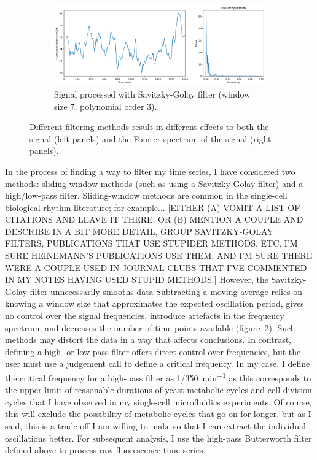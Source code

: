 \begin{figure}
  \begin{subfigure}[htpb]{0.8\textwidth}
   \centering
   \includegraphics[width=\textwidth]{fft_savgol}
   \caption{
     Signal processed with Savitzky-Golay filter (window size 7, polynomial order 3).
   }
   \label{fig:analysis-filter-savgol}
  \end{subfigure}
  \caption{
    Different filtering methods result in different effects to both the signal (left panels) and the Fourier spectrum of the signal (right panels).
  }
  \label{fig:analysis-filter}
\end{figure}

In the process of finding a way to filter my time series, I have considered two methods: sliding-window methods (such as using a Savitzky-Golay filter) and a high/low-pass filter.
Sliding-window methods are common in the single-cell biological rhythm literature; for example... [EITHER (A) VOMIT A LIST OF CITATIONS AND LEAVE IT THERE, OR (B) MENTION A COUPLE AND DESCRIBE IN A BIT MORE DETAIL, GROUP SAVITZKY-GOLAY FILTERS, PUBLICATIONS THAT USE STUPIDER METHODS, ETC.  I'M SURE HEINEMANN'S PUBLICATIONS USE THEM, AND I'M SURE THERE WERE A COUPLE USED IN JOURNAL CLUBS THAT I'VE COMMENTED IN MY NOTES HAVING USED STUPID METHODS.]
However, the Savitzky-Golay filter unnecessarily smooths data
Subtracting a moving average relies on knowing a window size that approximates the expected oscillation period, gives no control over the signal frequencies, introduce artefacts in the frequency spectrum, and decreases the number of time points available (figure~\ref{fig:analysis-filter}).
Such methods may distort the data in a way that affects conclusions.
In contrast, defining a high- or low-pass filter offers direct control over frequencies, but the user must use a judgement call to define a critical frequency.
In my case, I define the critical frequency for a high-pass filter as \SI[parse-numbers=false]{1/350}{\minute^{-1}} as this corresponds to the upper limit of reasonable durations of yeast metabolic cycles and cell division cycles that I have observed in my single-cell microfluidics experiments.
Of course, this will exclude the possibility of metabolic cycles that go on for longer, but as I said, this is a trade-off I am willing to make so that I can extract the individual oscillations better.
For subsequent analysis, I use the high-pass Butterworth filter defined above to process raw fluorescence time series.

